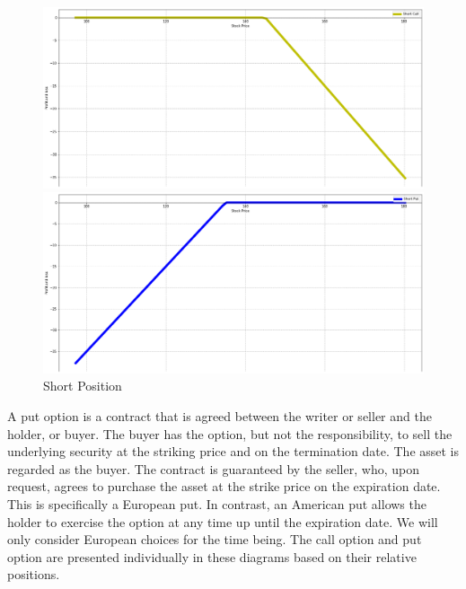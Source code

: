 \begin{figure}[!htb]
	\begin{minipage}[l]{0.5\linewidth}
		\begin{center}
			\includegraphics[width=1\textwidth]{Short_call}
		\end{center}
	\end{minipage}
	\hfill
	\begin{minipage}[r]{0.5\linewidth}
		\begin{center}
			\includegraphics[width=1\textwidth]{Short_put}
		\end{center}
	\end{minipage}
	\caption{ Short Position}
\end{figure}

A put option is a contract that is agreed between the writer or seller and the holder, or buyer. The buyer has the option, but not the responsibility, to sell the underlying security at the striking price and on the termination date. The asset is regarded as the buyer. The contract is guaranteed by the seller, who, upon request, agrees to purchase the asset at the strike price on the expiration date.
This is specifically a European put. In contrast, an American put allows the holder to exercise the option at any time up until the expiration date. We will only consider European choices for the time being.
The call option and put option are presented individually in these diagrams based on their relative positions.   

